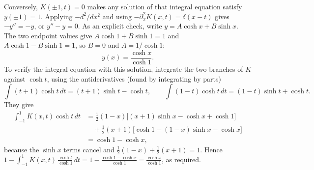 Conversely, $K(\pm1,t)=0$ makes any solution of that integral equation
satisfy $y(\pm1)=1$. Applying $-d^2/dx^2$ and using
$-\partial_x^2K(x,t)=\delta(x-t)$ gives $-y''=-y$, or $y''-y=0$.
As an explicit check, write $y=A\cosh x+B\sinh x$. The two endpoint
values give $A\cosh1+B\sinh1=1$ and $A\cosh1-B\sinh1=1$, so $B=0$ and
$A=1/\cosh1$:
\[
\boxed{y(x)=\frac{\cosh x}{\cosh1}.}
\]
To verify the integral equation with this solution, integrate the two
branches of $K$ against $\cosh t$, using the antiderivatives (found by
integrating by parts)
\[
\int(t+1)\cosh t\,dt=(t+1)\sinh t-\cosh t,\qquad
\int(1-t)\cosh t\,dt=(1-t)\sinh t+\cosh t.
\]
They give
\begin{align*}
\int_{-1}^1K(x,t)\cosh t\,dt
&=\tfrac12(1-x)\bigl[(x+1)\sinh x-\cosh x+\cosh1\bigr]\\
&\quad+\tfrac12(x+1)\bigl[\cosh1-(1-x)\sinh x-\cosh x\bigr]\\
&=\cosh1-\cosh x,
\end{align*}
because the $\sinh x$ terms cancel and
$\frac12(1-x)+\frac12(x+1)=1$. Hence
$1-\int_{-1}^1K(x,t)\,\frac{\cosh t}{\cosh1}\,dt
=1-\frac{\cosh1-\cosh x}{\cosh1}=\frac{\cosh x}{\cosh1}$,
as required.

